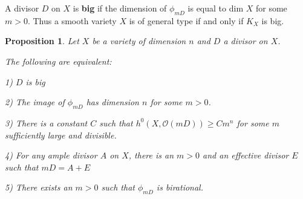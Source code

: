 \documentclass[a4paper]{article}
\newtheorem{proposition}[theorem]{Proposition}
\numberwithin{theorem}{section}
\begin{document}
A divisor $D$ on $X$ is \textbf{big} if the dimension of $\phi_{mD}$ is equal to dim $X$ for some $m > 0$. Thus a smooth variety $X$ is of general type if and only if $K_X$ is big.

\begin{proposition} \label{big}
Let $X$ be a variety of dimension $n$ and $D$ a divisor on $X$.

The following are equivalent:

1) $D$ is big

2) The image of $\phi_{mD}$ has dimension $n$ for some $m > 0$.

3) There is a constant $C$ such that $h^0(X, \mathcal{O}(mD)) \geq C m^n$ for some $m$ sufficiently large and divisible.

4) For any ample divisor $A$ on $X$, there is an $m > 0$ and an effective divisor $E$ such that $mD = A + E $

5) There exists an $m > 0$ such that $\phi_{mD}$ is birational.

\end{proposition}
\end{document}
